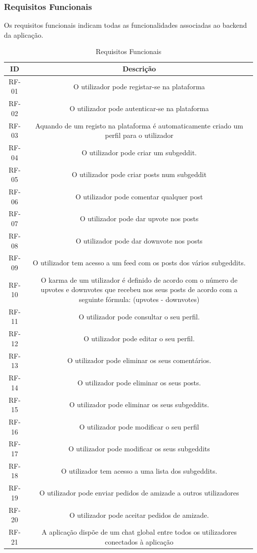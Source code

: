 \documentclass{article}
\begin{document}
		\subsubsection{Requisitos Funcionais}
		Os requisitos funcionais indicam todas as funcionalidades associadas ao backend da aplicação.
		\begin{table}[H]
			\centering
			\begin{tabular}{|c|c|}
				\hline
				ID & Descrição \\
				\hline
				RF-01 & O utilizador pode registar-se na plataforma \\
				\hline
				RF-02 & O utilizador pode autenticar-se na plataforma \\
				\hline
				RF-03 & Aquando de um registo na plataforma é automaticamente criado um perfil para o utilizador \\
				\hline
				RF-04 & O utilizador pode criar um subgeddit. \\
				\hline
				RF-05 & O utilizador pode criar posts num subgeddit \\
				\hline
				RF-06 & O utilizador pode comentar qualquer post \\
				\hline
				RF-07 & O utilizador pode dar upvote nos posts \\
				\hline
				RF-08 & O utilizador pode dar downvote nos posts \\
				\hline
				RF-09 & O utilizador tem acesso a um feed com os posts dos vários subgeddits. \\
				\hline
				RF-10 & O karma de um utilizador é definido de acordo com o número de upvotes e downvotes que recebeu nos seus posts de acordo com a seguinte fórmula: (upvotes - downvotes) \\
				\hline
				RF-11 & O utilizador pode consultar o seu perfil. \\
				\hline
				RF-12 & O utilizador pode editar o seu perfil. \\
				\hline
				RF-13 & O utilizador pode eliminar os seus comentários. \\
				\hline
				RF-14 & O utilizador pode eliminar os seus posts. \\
				\hline
				RF-15 & O utilizador pode eliminar os seus subgeddits. \\
				\hline
				RF-16 & O utilizador pode modificar o seu perfil \\
				\hline
				RF-17 & O utilizador pode modificar os seus subgeddits \\
				\hline
				RF-18 & O utilizador tem acesso a uma lista dos subgeddits. \\
				\hline
				RF-19 & O utilizador pode enviar pedidos de amizade a outros utilizadores \\
				\hline
				RF-20 & O utilizador pode aceitar pedidos de amizade. \\
				\hline
				RF-21 & A aplicação dispõe de um chat global entre todos os utilizadores conectados à aplicação \\
				\hline
			\end{tabular}
			\caption{Requisitos Funcionais}
		\end{table}
\end{document}
